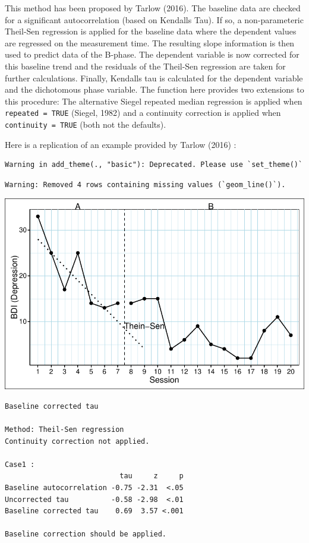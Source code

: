 \documentclass[
  letterpaper,
  DIV=11,
  numbers=noendperiod]{scrreprt}
\begin{document}
This method has been proposed by Tarlow (2016). The baseline data are
checked for a significant autocorrelation (based on Kendalls Tau). If
so, a non-parameteric Theil-Sen regression is applied for the baseline
data where the dependent values are regressed on the measurement time.
The resulting slope information is then used to predict data of the
B-phase. The dependent variable is now corrected for this baseline trend
and the residuals of the Theil-Sen regression are taken for further
calculations. Finally, Kendalls tau is calculated for the dependent
variable and the dichotomous phase variable. The function here provides
two extensions to this procedure: The alternative Siegel repeated median
regression is applied when \texttt{repeated\ =\ TRUE} (Siegel, 1982) and
a continuity correction is applied when \texttt{continuity\ =\ TRUE}
(both not the defaults).

Here is a replication of an example provided by Tarlow (2016) :

\begin{verbatim}
Warning in add_theme(., "basic"): Deprecated. Please use `set_theme()`
\end{verbatim}

\begin{verbatim}
Warning: Removed 4 rows containing missing values (`geom_line()`).
\end{verbatim}

\includegraphics{./ch_overlapping_indices_files/figure-pdf/bctau-example-1.pdf}

\begin{verbatim}
Baseline corrected tau

Method: Theil-Sen regression
Continuity correction not applied.

Case1 :
                           tau     z     p
Baseline autocorrelation -0.75 -2.31  <.05
Uncorrected tau          -0.58 -2.98  <.01
Baseline corrected tau    0.69  3.57 <.001

Baseline correction should be applied.
\end{verbatim}
\end{document}
